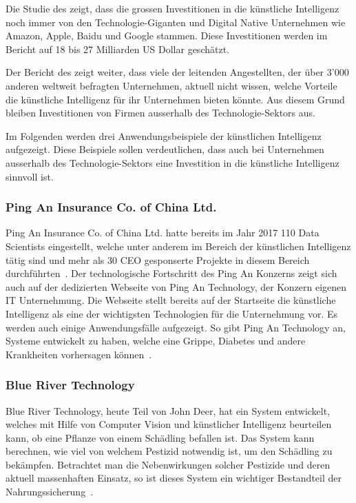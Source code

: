 Die Studie des \textcite{Bughin} zeigt, dass die grossen Investitionen in die künstliche Intelligenz noch immer von den Technologie-Giganten und Digital Native Unternehmen wie Amazon, Apple, Baidu und Google stammen. Diese Investitionen werden im Bericht auf 18 bis 27 Milliarden US Dollar geschätzt. 

Der Bericht des \textcite{Bughin} zeigt weiter, dass viele der leitenden Angestellten, der über 3'000 anderen weltweit befragten Unternehmen, aktuell nicht wissen, welche Vorteile die künstliche Intelligenz für ihr Unternehmen bieten könnte. Aus diesem Grund bleiben Investitionen von Firmen ausserhalb des Technologie-Sektors aus.

Im Folgenden werden drei Anwendungsbeispiele der künstlichen Intelligenz aufgezeigt. Diese Beispiele sollen verdeutlichen, dass auch bei Unternehmen ausserhalb des Technologie-Sektors eine Investition in die künstliche Intelligenz sinnvoll ist.

\subsubsection{Ping An Insurance Co. of China Ltd.}

Ping An Insurance Co. of China Ltd. hatte bereits im Jahr 2017 110 Data Scientists eingestellt, welche unter anderem im Bereich der künstlichen Intelligenz tätig sind und mehr als 30 CEO gesponserte Projekte in diesem Bereich durchführten~\autocite{Ransbotham2017}. Der technologische Fortschritt des Ping An Konzerns zeigt sich auch auf der dedizierten Webseite von Ping An Technology, der Konzern eigenen IT Unternehmung. Die Webseite stellt bereits auf der Startseite die künstliche Intelligenz als eine der wichtigsten Technologien für die Unternehmung vor. Es werden auch einige Anwendungsfälle aufgezeigt. So gibt Ping An Technology an, Systeme entwickelt zu haben, welche eine Grippe, Diabetes und andere Krankheiten vorhersagen können~\autocite{PingAnTechnology}.

\subsubsection{Blue River Technology}


Blue River Technology, heute Teil von John Deer, hat ein System entwickelt, welches mit Hilfe von Computer Vision und künstlicher Intelligenz beurteilen kann, ob eine Pflanze von einem Schädling befallen ist. Das System kann berechnen, wie viel von welchem Pestizid notwendig ist, um den Schädling zu bekämpfen. Betrachtet man die Nebenwirkungen solcher Pestizide und deren aktuell massenhaften Einsatz, so ist dieses System ein wichtiger Bestandteil der Nahrungssicherung~\autocite{BlueRiverTechnology}.

